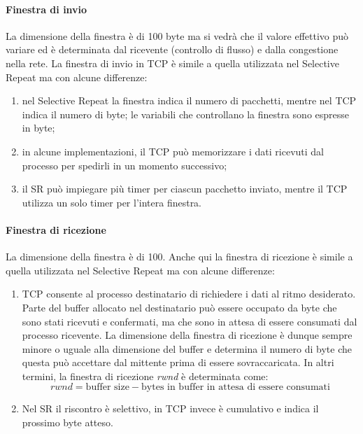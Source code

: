 \documentclass[12pt]{report}
\begin{document}
	\paragraph{Finestra di invio}
	La dimensione della finestra è di 100 byte ma si vedrà che il valore effettivo può variare ed è determinata dal ricevente (controllo di flusso) e dalla congestione nella rete. La finestra di invio in TCP è simile a quella utilizzata nel Selective Repeat ma con alcune differenze:
	\begin{enumerate}
		\item nel Selective Repeat la finestra indica il numero di pacchetti, mentre nel TCP indica il numero di byte; le variabili che controllano la finestra sono espresse in byte;
		\item in alcune implementazioni, il TCP può memorizzare i dati ricevuti dal processo per spedirli in un momento successivo;
		\item il SR può impiegare più timer per ciascun pacchetto inviato, mentre il TCP utilizza un solo timer per l'intera finestra.
	\end{enumerate}

	\paragraph{Finestra di ricezione}
	La dimensione della finestra è di 100. Anche qui la finestra di ricezione è simile a quella utilizzata nel Selective Repeat ma con alcune differenze:
	\begin{enumerate}
		\item TCP consente al processo destinatario di richiedere i dati al ritmo desiderato. Parte del buffer allocato nel destinatario può essere occupato da byte che sono stati ricevuti e confermati, ma che sono in attesa di essere consumati dal processo ricevente. La dimensione della finestra di ricezione è dunque sempre minore o uguale alla dimensione del buffer e determina il numero di byte che questa può accettare dal mittente prima di essere sovraccaricata. In altri termini, la finestra di ricezione \textit{rwnd} è determinata come:
		\[
			rwnd = \text{buffer size} - \text{bytes in buffer in attesa di essere consumati}
		\]
		\item Nel SR il riscontro è selettivo, in TCP invece è cumulativo e indica il prossimo byte atteso.
	\end{enumerate}
\end{document}
